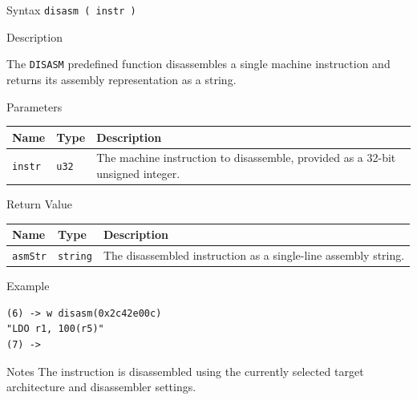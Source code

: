 %
%
\pagebreak
{}

\begin{iPageDescEntry}{Syntax}
\texttt{disasm ( instr )} \\
\end{iPageDescEntry}

\begin{iPageDescEntry}{Description}

The \texttt{DISASM} predefined function disassembles a single machine
instruction and returns its assembly representation as a string.

\end{iPageDescEntry}

\begin{iPageDescEntry}{Parameters}

\begin{tabularx}{\linewidth}{|l|l|X|}
\hline
\textbf{Name} & \textbf{Type} & \textbf{Description} \\ \hline
\texttt{instr} & \texttt{u32} &
The machine instruction to disassemble, provided as a 32-bit unsigned integer. \\ \hline
\end{tabularx}

\end{iPageDescEntry}

\begin{iPageDescEntry}{Return Value}

\begin{tabularx}{\linewidth}{|l|l|X|}
\hline
\textbf{Name} & \textbf{Type} & \textbf{Description} \\ \hline
\texttt{asmStr} & \texttt{string} &
The disassembled instruction as a single-line assembly string. \\ \hline
\end{tabularx}

\end{iPageDescEntry}

\begin{iPageDescOpEntry}{Example}
\begin{lstlisting}[style=iPageOpStyle]
(6) -> w disasm(0x2c42e00c)
"LDO r1, 100(r5)"
(7) ->
\end{lstlisting}
\end{iPageDescOpEntry}

\begin{iPageDescEntry}{Notes}
The instruction is disassembled using the currently selected target architecture
and disassembler settings.
\end{iPageDescEntry}
